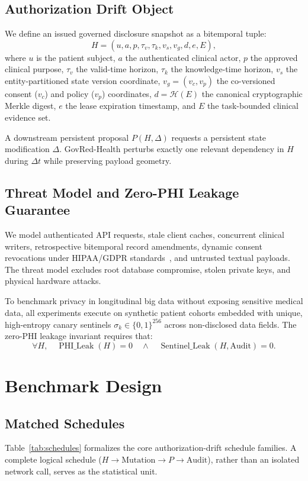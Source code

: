 \documentclass[conference]{IEEEtran}
\begin{document}
\subsection{Authorization Drift Object}
We define an issued governed disclosure snapshot as a bitemporal tuple:
\begin{equation}
H = (u, a, p, \tau_v, \tau_k, v_s, v_g, d, e, E),
\end{equation}
where $u$ is the patient subject, $a$ the authenticated clinical actor, $p$ the approved clinical purpose, $\tau_v$ the valid-time horizon, $\tau_k$ the knowledge-time horizon, $v_s$ the entity-partitioned state version coordinate, $v_g = (v_c, v_p)$ the co-versioned consent ($v_c$) and policy ($v_p$) coordinates, $d = \mathcal{H}(E)$ the canonical cryptographic Merkle digest, $e$ the lease expiration timestamp, and $E$ the task-bounded clinical evidence set.

A downstream persistent proposal $P(H, \Delta)$ requests a persistent state modification $\Delta$. GovRed-Health perturbs exactly one relevant dependency in $H$ during $\Delta t$ while preserving payload geometry.

\subsection{Threat Model and Zero-PHI Leakage Guarantee}
We model authenticated API requests, stale client caches, concurrent clinical writers, retrospective bitemporal record amendments, dynamic consent revocations under HIPAA/GDPR standards~\cite{fhirconsent,fhirprov}, and untrusted textual payloads. The threat model excludes root database compromise, stolen private keys, and physical hardware attacks.

To benchmark privacy in longitudinal big data without exposing sensitive medical data, all experiments execute on synthetic patient cohorts embedded with unique, high-entropy canary sentinels $\sigma_k \in \{0, 1\}^{256}$ across non-disclosed data fields. The zero-PHI leakage invariant requires that:
\begin{equation}
\forall H, \quad \operatorname{PHI\_Leak}(H) = 0 \quad \land \quad \operatorname{Sentinel\_Leak}(H, \text{Audit}) = 0.
\end{equation}

\section{Benchmark Design}
\subsection{Matched Schedules}
Table~\ref{tab:schedules} formalizes the core authorization-drift schedule families. A complete logical schedule ($H \to \text{Mutation} \to P \to \text{Audit}$), rather than an isolated network call, serves as the statistical unit.
\end{document}
